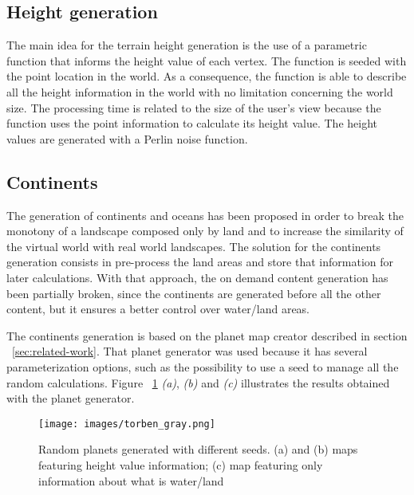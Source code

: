 \documentclass[10pt, conference, compsocconf]{IEEEtran}
\begin{document}
\subsection{Height generation}
\label{sub:relevo}

The main idea for the terrain height generation is the use of a parametric function that informs the height value of each vertex. The function is seeded with the point location in the world. As a consequence, the function is able to describe all the height information in the world with no limitation concerning the world size. The processing time is related to the size of the user's view because the function uses the point information to calculate its height value. The height values are generated with a Perlin noise function.


\subsection{Continents}

The generation of continents and oceans has been proposed in order to break the monotony of a landscape composed only by land and to increase the similarity of the virtual world with real world landscapes. The solution for the continents generation consists in pre-process the land areas and store that information for later calculations. With that approach, the on demand content generation has been partially broken, since the continents are generated before all the other content, but it ensures a better control over water/land areas. 

The continents generation is based on the planet map creator described in section ~\ref{sec:related-work}. That planet generator was used because it has several parameterization options, such as the possibility to use a seed to manage all the random calculations. Figure ~\ref{fig:torben} {\it (a)}, {\it (b)} and {\it (c)} illustrates the results obtained with the planet generator.

\begin{figure}
\centering
\texttt{[image: images/torben\_gray.png]}
\caption{Random planets generated with different seeds. (a) and (b) maps featuring height value information; (c) map featuring only information about what is water/land}
\label{fig:torben}
\end{figure}
~\cite{torben}
\end{document}
